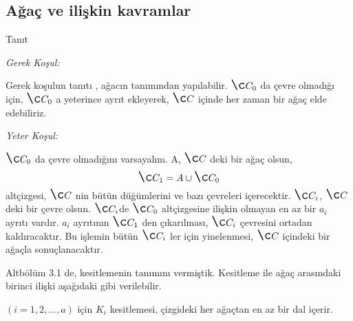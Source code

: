\documentclass[11pt]{amsbook}
\begin{document}
\subsection{Ağaç ve ilişkin kavramlar}
Tanıt

\label{Gerek Kosul}
     \textit{Gerek Koşul:}
    
    Gerek koşulun tanıtı , ağacın tanımından yapılabilir. ${\Large Ç_0}$ da çevre olmadığı için, ${\Large Ç_0}$ a yeterince ayrıt ekleyerek,  ${\Large Ç}$  içinde her zaman bir ağaç elde edebiliriz.
    
\label{Yeter Kosul}
     \textit{Yeter Koşul:}
    
    ${\Large Ç_0}$ da çevre olmadığını varsayalım. A,  ${\Large Ç}$ deki bir ağaç olsun, $$ {\Large Ç_1} = A \cup {\Large Ç_0} $$
    altçizgesi, ${\Large Ç}$ nin bütün düğümlerini ve bazı çevreleri içerecektir. ${\Large Ç_i}$, ${\Large Ç}$ deki bir çevre olsun. ${\Large Ç_i}$de ${\Large Ç_0}$ altçizgesine ilişkin olmayan en az bir $a_i$ ayrıtı vardır. $a_i$ ayrıtının ${\Large Ç_1}$ den çıkarılması, ${\Large Ç_i}$ çevresini ortadan kaldıracaktır. Bu işlemin bütün ${\Large Ç_i}$ ler için yinelenmesi, ${\Large Ç}$ içindeki bir ağaçla sonuçlanacaktır.
    
    Altbölüm 3.1 de, kesitlemenin tanımını vermiştik. Kesitleme ile ağaç arasındaki birinci ilişki aşağıdaki gibi verilebilir. 
\begin{theorem}
$ \left ( i = 1,2, \dotsc , a \right ) $ için $K_i$ kesitlemesi, çizgideki her ağaçtan en az bir dal içerir.
\end{theorem}
\end{document}
